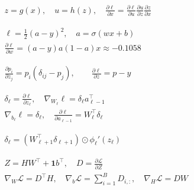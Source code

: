\documentclass[border=4pt,multi=preview]{standalone}
\begin{document}
\begin{preview}\color{ink}\fontsize{24}{30}\selectfont
$\displaystyle \begin{gathered}z=g(x),\quad u=h(z),\quad \frac{\partial\ell}{\partial x}=\frac{\partial\ell}{\partial u}\frac{\partial u}{\partial z}\frac{\partial z}{\partial x}\end{gathered}$
\end{preview}
\begin{preview}\color{ink}\fontsize{24}{30}\selectfont
$\displaystyle \begin{gathered}\ell=\tfrac12(a-y)^2,\quad a=\sigma(wx+b)\\\frac{\partial\ell}{\partial w}=(a-y)a(1-a)x\approx-0.1058\end{gathered}$
\end{preview}
\begin{preview}\color{ink}\fontsize{24}{30}\selectfont
$\displaystyle \begin{gathered}\frac{\partial p_i}{\partial z_j}=p_i(\delta_{ij}-p_j),\qquad\frac{\partial\ell}{\partial z}=p-y\end{gathered}$
\end{preview}
\begin{preview}\color{ink}\fontsize{24}{30}\selectfont
$\displaystyle \begin{gathered}\delta_\ell=\frac{\partial\ell}{\partial z_\ell},\quad\nabla_{W_\ell}\ell=\delta_\ell a_{\ell-1}^{\top}\\\nabla_{b_\ell}\ell=\delta_\ell,\quad\frac{\partial\ell}{\partial a_{\ell-1}}=W_\ell^\top\delta_\ell\end{gathered}$
\end{preview}
\begin{preview}\color{ink}\fontsize{24}{30}\selectfont
$\displaystyle \begin{gathered}\delta_\ell=\left(W_{\ell+1}^\top\delta_{\ell+1}\right)\odot\phi_\ell'(z_\ell)\end{gathered}$
\end{preview}
\begin{preview}\color{ink}\fontsize{24}{30}\selectfont
$\displaystyle \begin{gathered}Z=HW^\top+\mathbf1b^\top,\quad D=\frac{\partial\mathcal L}{\partial Z}\\\nabla_W\mathcal L=D^\top H,\quad\nabla_b\mathcal L=\sum_{i=1}^{B}D_{i,:},\quad\nabla_H\mathcal L=DW\end{gathered}$
\end{preview}
\end{document}
